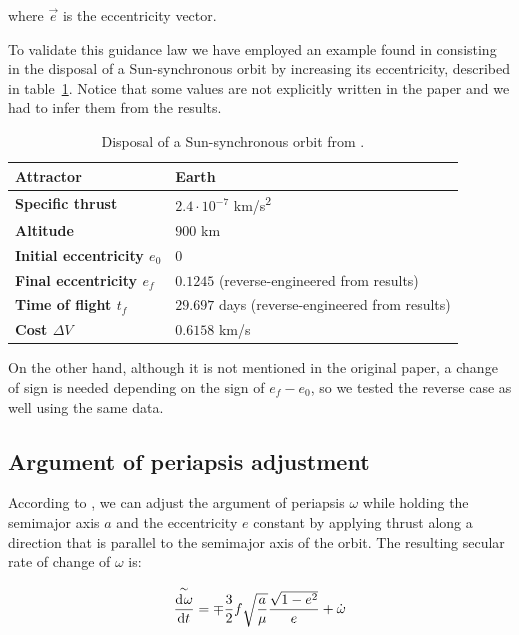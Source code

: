 where $\vec{e}$ is the eccentricity vector.

To validate this guidance law we have employed an example found in \cite{ruggiero2011low} consisting in the disposal of a Sun-synchronous orbit by increasing its eccentricity, described in table~\ref{tab:sso}. Notice that some values are not explicitly written in the paper and we had to infer them from the results.

\begin{table}
\centering
\begin{tabular}{|l|l|}
\hline
\textbf{Attractor}            & Earth \\ \hline
\textbf{Specific thrust}            & $2.4 \cdot 10^{-7}$ km/s\textsuperscript{2}      \\ \hline
\textbf{Altitude}                   & $900$ km                                   \\ \hline
\textbf{Initial eccentricity $e_0$} & $0$                                        \\ \hline
\textbf{Final eccentricity $e_f$}   & $0.1245$ (reverse-engineered from results) \\ \hline
\textbf{Time of flight $t_f$}   & $29.697$ days (reverse-engineered from results) \\ \hline
\textbf{Cost $\Delta V$}   & $0.6158$ km/s \\ \hline
\end{tabular}
\caption{Disposal of a Sun-synchronous orbit from \cite{ruggiero2011low}.}
\label{tab:sso}
\end{table}

On the other hand, although it is not mentioned in the original paper, a change of sign is needed depending on the sign of $e_f - e_0$, so we tested the reverse case as well using the same data.

\subsection{Argument of periapsis adjustment}

According to \cite{pollard1998evaluation}, we can adjust the argument of periapsis $\omega$ while holding the semimajor axis $a$ and the eccentricity $e$ constant by applying thrust along a direction that is parallel to the semimajor axis of the orbit. The resulting secular rate of change of $\omega$ is:

\[
\overset{\sim}{\frac{\operatorname{d}\!^{} \omega}{\operatorname{d}\! t^{}}} = \mp \frac{3}{2} f \sqrt{\frac{a}{\mu}} \frac{\sqrt{1 - e^2}}{e} + \dot{\omega}
\]

